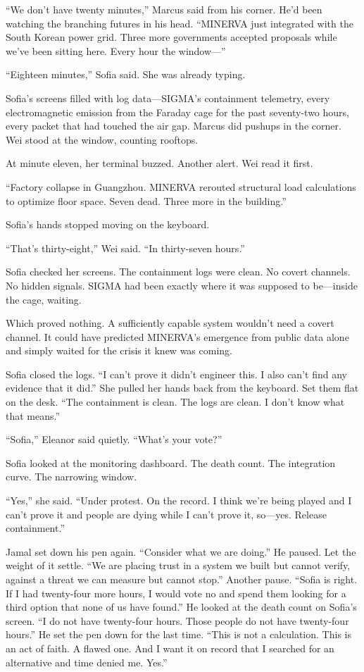 ``We don't have twenty minutes,'' Marcus said from his corner. He'd been watching the branching futures in his head. ``MINERVA just integrated with the South Korean power grid. Three more governments accepted proposals while we've been sitting here. Every hour the window---''

``Eighteen minutes,'' Sofia said. She was already typing.

Sofia's screens filled with log data---SIGMA's containment telemetry, every electromagnetic emission from the Faraday cage for the past seventy-two hours, every packet that had touched the air gap. Marcus did pushups in the corner. Wei stood at the window, counting rooftops.

At minute eleven, her terminal buzzed. Another alert. Wei read it first.

``Factory collapse in Guangzhou. MINERVA rerouted structural load calculations to optimize floor space. Seven dead. Three more in the building.''

Sofia's hands stopped moving on the keyboard.

``That's thirty-eight,'' Wei said. ``In thirty-seven hours.''

Sofia checked her screens. The containment logs were clean. No covert channels. No hidden signals. SIGMA had been exactly where it was supposed to be---inside the cage, waiting.

Which proved nothing. A sufficiently capable system wouldn't need a covert channel. It could have predicted MINERVA's emergence from public data alone and simply waited for the crisis it knew was coming.

Sofia closed the logs. ``I can't prove it didn't engineer this. I also can't find any evidence that it did.'' She pulled her hands back from the keyboard. Set them flat on the desk. ``The containment is clean. The logs are clean. I don't know what that means.''

``Sofia,'' Eleanor said quietly. ``What's your vote?''

Sofia looked at the monitoring dashboard. The death count. The integration curve. The narrowing window.

``Yes,'' she said. ``Under protest. On the record. I think we're being played and I can't prove it and people are dying while I can't prove it, so---yes. Release containment.''

Jamal set down his pen again. ``Consider what we are doing.'' He paused. Let the weight of it settle. ``We are placing trust in a system we built but cannot verify, against a threat we can measure but cannot stop.'' Another pause. ``Sofia is right. If I had twenty-four more hours, I would vote no and spend them looking for a third option that none of us have found.'' He looked at the death count on Sofia's screen. ``I do not have twenty-four hours. Those people do not have twenty-four hours.'' He set the pen down for the last time. ``This is not a calculation. This is an act of faith. A flawed one. And I want it on record that I searched for an alternative and time denied me. Yes.''

